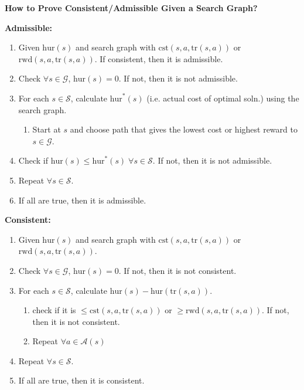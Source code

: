 \begin{process} \textbf{How to Prove Consistent/Admissible Given a Search Graph?}
   
    \textbf{Admissible:}
    \begin{enumerate}
        \item Given $\text{hur}(s)$ and search graph with $\text{cst}(s,a,\text{tr}(s,a))$ or $\text{rwd}(s,a,\text{tr}(s,a))$. If consistent, then it is admissible.
        \item Check $\forall s \in \mathcal{G}$, $\text{hur}(s) = 0$. If not, then it is not admissible.
        \item For each $s \in \mathcal{S}$, calculate $\text{hur}^*(s)$ (i.e. actual cost of optimal soln.) using the search graph.
        \begin{enumerate}
            \item Start at $s$ and choose path that gives the lowest cost or highest reward to $s \in \mathcal{G}$. 
        \end{enumerate}
        \item Check if $\text{hur}(s) \leq \text{hur}^*(s) \; \forall s \in \mathcal{S}$. If not, then it is not admissible.
        \item Repeat $\forall s \in \mathcal{S}$. 
        \item If all are true, then it is admissible.
    \end{enumerate}
    \vspace{1em}

    \textbf{Consistent:}
    \begin{enumerate}
        \item Given $\text{hur}(s)$ and search graph with $\text{cst}(s,a,\text{tr}(s,a))$ or $\text{rwd}(s,a,\text{tr}(s,a))$. 
        \item Check $\forall s \in \mathcal{G}$, $\text{hur}(s) = 0$. If not, then it is not consistent.
        \item For each $s \in \mathcal{S}$, calculate $\text{hur}(s) - \text{hur}(\text{tr}(s, a))$.
        \begin{enumerate}
            \item check if it is $\leq \text{cst}(s,a,\text{tr}(s,a))$ or $\geq \text{rwd}(s,a,\text{tr}(s,a))$. If not, then it is not consistent.
            \item Repeat $\forall a \in \mathcal{A}(s)$
        \end{enumerate}
        \item Repeat $\forall s \in \mathcal{S}$.
        \item If all are true, then it is consistent.
    \end{enumerate}
\end{process}

